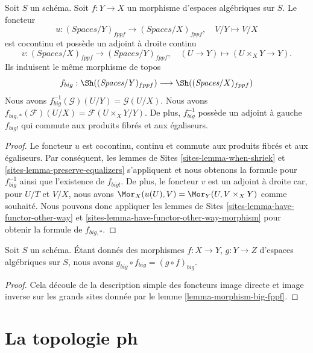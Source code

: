 \begin{lemma}
\label{lemma-morphism-big-fppf}
Soit $S$ un schéma.
Soit $f : Y \to X$ un morphisme d'espaces algébriques sur $S$.
Le foncteur
$$
u : (\textit{Spaces}/Y)_{fppf} \longrightarrow (\textit{Spaces}/X)_{fppf},
\quad
V/Y \longmapsto V/X
$$
est cocontinu et possède un adjoint à droite continu
$$
v : (\textit{Spaces}/X)_{fppf} \longrightarrow (\textit{Spaces}/Y)_{fppf},
\quad
(U \to Y) \longmapsto (U \times_X Y \to Y).
$$
Ils induisent le même morphisme de topos
$$
f_{big} :
\Sh((\textit{Spaces}/Y)_{fppf})
\longrightarrow
\Sh((\textit{Spaces}/X)_{fppf})
$$
Nous avons $f_{big}^{-1}(\mathcal{G})(U/Y) = \mathcal{G}(U/X)$.
Nous avons $f_{big, *}(\mathcal{F})(U/X) = \mathcal{F}(U \times_X Y/Y)$.
De plus, $f_{big}^{-1}$ possède un adjoint à gauche $f_{big!}$ qui commute aux
produits fibrés et aux égaliseurs.
\end{lemma}

\begin{proof}
Le foncteur $u$ est cocontinu, continu et commute aux produits fibrés
et aux égaliseurs. Par conséquent,
les lemmes de Sites \ref{sites-lemma-when-shriek} et
\ref{sites-lemma-preserve-equalizers}
s'appliquent et nous obtenons la formule
pour $f_{big}^{-1}$ ainsi que l'existence de $f_{big!}$. De plus,
le foncteur $v$ est un adjoint à droite car, pour $U/T$ et $V/X$,
nous avons $\Mor_X(u(U), V) = \Mor_Y(U, V \times_X Y)$
comme souhaité. Nous pouvons donc appliquer
les lemmes de Sites \ref{sites-lemma-have-functor-other-way} et
\ref{sites-lemma-have-functor-other-way-morphism} pour obtenir la
formule de $f_{big, *}$.
\end{proof}

\begin{lemma}
\label{lemma-composition-fppf}
Soit $S$ un schéma. Étant donnés des morphismes $f : X \to Y$, $g : Y \to Z$
d'espaces algébriques sur $S$, nous avons
$g_{big} \circ f_{big} = (g \circ f)_{big}$.
\end{lemma}

\begin{proof}
Cela découle de la description simple des foncteurs image directe
et image inverse sur les grands sites donnée par le
lemme \ref{lemma-morphism-big-fppf}.
\end{proof}








\section{La topologie ph}
\label{section-ph}

